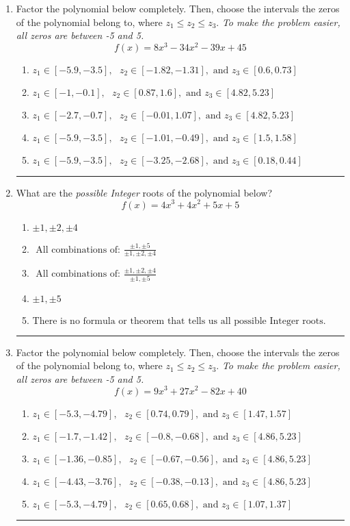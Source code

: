 \documentclass[14pt]{extbook}
\newcommand{\litem}[1]{\item#1\hspace*{-1cm}\rule{\textwidth}{0.4pt}}
\begin{document}
\begin{enumerate}
\litem{
Factor the polynomial below completely. Then, choose the intervals the zeros of the polynomial belong to, where $z_1 \leq z_2 \leq z_3$. \textit{To make the problem easier, all zeros are between -5 and 5.}\[ f(x) = 8x^{3} -34 x^{2} -39 x + 45 \]\begin{enumerate}[label=\Alph*.]
\item \( z_1 \in [-5.9, -3.5], \text{   }  z_2 \in [-1.82, -1.31], \text{   and   } z_3 \in [0.6, 0.73] \)
\item \( z_1 \in [-1, -0.1], \text{   }  z_2 \in [0.87, 1.6], \text{   and   } z_3 \in [4.82, 5.23] \)
\item \( z_1 \in [-2.7, -0.7], \text{   }  z_2 \in [-0.01, 1.07], \text{   and   } z_3 \in [4.82, 5.23] \)
\item \( z_1 \in [-5.9, -3.5], \text{   }  z_2 \in [-1.01, -0.49], \text{   and   } z_3 \in [1.5, 1.58] \)
\item \( z_1 \in [-5.9, -3.5], \text{   }  z_2 \in [-3.25, -2.68], \text{   and   } z_3 \in [0.18, 0.44] \)

\end{enumerate} }
\litem{
What are the \textit{possible Integer} roots of the polynomial below?\[ f(x) = 4x^{3} +4 x^{2} +5 x + 5 \]\begin{enumerate}[label=\Alph*.]
\item \( \pm 1,\pm 2,\pm 4 \)
\item \( \text{ All combinations of: }\frac{\pm 1,\pm 5}{\pm 1,\pm 2,\pm 4} \)
\item \( \text{ All combinations of: }\frac{\pm 1,\pm 2,\pm 4}{\pm 1,\pm 5} \)
\item \( \pm 1,\pm 5 \)
\item \( \text{There is no formula or theorem that tells us all possible Integer roots.} \)

\end{enumerate} }
\litem{
Factor the polynomial below completely. Then, choose the intervals the zeros of the polynomial belong to, where $z_1 \leq z_2 \leq z_3$. \textit{To make the problem easier, all zeros are between -5 and 5.}\[ f(x) = 9x^{3} +27 x^{2} -82 x + 40 \]\begin{enumerate}[label=\Alph*.]
\item \( z_1 \in [-5.3, -4.79], \text{   }  z_2 \in [0.74, 0.79], \text{   and   } z_3 \in [1.47, 1.57] \)
\item \( z_1 \in [-1.7, -1.42], \text{   }  z_2 \in [-0.8, -0.68], \text{   and   } z_3 \in [4.86, 5.23] \)
\item \( z_1 \in [-1.36, -0.85], \text{   }  z_2 \in [-0.67, -0.56], \text{   and   } z_3 \in [4.86, 5.23] \)
\item \( z_1 \in [-4.43, -3.76], \text{   }  z_2 \in [-0.38, -0.13], \text{   and   } z_3 \in [4.86, 5.23] \)
\item \( z_1 \in [-5.3, -4.79], \text{   }  z_2 \in [0.65, 0.68], \text{   and   } z_3 \in [1.07, 1.37] \)


\end{enumerate}}
\end{enumerate}
\end{document}
